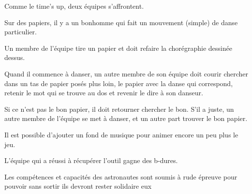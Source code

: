 \documentclass{grand-jeu}
\begin{document}
\begin{liste-materiel}
\end{liste-materiel}

\begin{regles}
Comme le time’s up, deux équipes s'affrontent.

Sur des papiers, il y a un bonhomme qui fait un mouvement (simple) de danse particulier.

Un membre de l’équipe tire un papier et doit refaire la chorégraphie dessinée dessus.

Quand il commence à danser, un autre membre de son équipe doit courir chercher dans un tas de papier posés plus loin, le papier avec la danse qui correspond, retenir le mot qui se trouve au dos et revenir le dire à son danseur.

Si ce n’est pas le bon papier, il doit retourner chercher le bon. S’il a juste, un autre membre de l’équipe se met à danser, et un autre part trouver le bon papier.

Il est possible d’ajouter un fond de musique pour animer encore un peu plus le jeu.

L’équipe qui a réussi à récupérer l’outil gagne des b-dures.
\end{regles}

\begin{imaginaire}
Les compétences et capacités des astronautes sont soumis à rude épreuve pour pouvoir sans sortir ils devront rester solidaire eux 
\end{imaginaire}

\begin{moments-stop}
\end{moments-stop}
\end{document}
